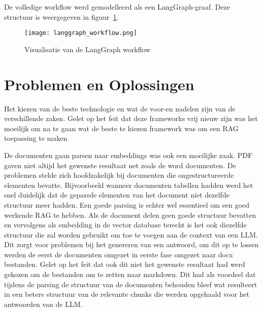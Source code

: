 De volledige workflow werd gemodelleerd als een LangGraph-graaf. Deze structuur is weergegeven in figuur~\ref{fig:langgraph}.

\begin{figure}[H]
    \centering
    \texttt{[image: langgraph\_workflow.png]}
    \caption{Visualisatie van de LangGraph workflow}
    \label{fig:langgraph}
\end{figure}




\section{Problemen en Oplossingen}


Het kiezen van de beste technologie en wat de voor-en nadelen zijn van de verschillende zaken. Gelet op het feit dat deze frameworks vrij nieuw zijn was het moeilijk om na te gaan wat de beste te kiezen framework was om een RAG toepassing te maken

De documenten gaan parsen naar embeddings was ook een moeilijke zaak. PDF gaven niet altijd het gewenste resultaat net zoals de word documenten.
De problemen stelde zich hoofdzakelijk bij documenten die ongestructureerde elementen bevatte. Bijvoorbeeld wanneer documenten tabellen hadden werd het snel duidelijk dat de geparsde elementen van het document niet dezelfde structuur meer hadden. Een goede parsing is echter wel essentieel om een goed werkende RAG te hebben. Als de document delen geen goede structuur bevatten en vervolgens als embedding in de vector database terecht is het ook diezelfde structuur die zal worden gebruikt om toe te voegen aan de context van een LLM. Dit zorgt voor problemen bij het genereren van een antwoord, om dit op te lossen werden de eerst de documenten omgezet in eerste fase omgezet naar docx bestanden. Gelet op het feit dat ook dit niet het gewenste resultaat had werd gekozen om de bestanden om te zetten naar markdown. Dit had als voordeel dat tijdens de parsing de structuur van de documenten behouden bleef wat resulteert in een betere structuur van de relevante chunks die werden opgehaald voor het antwoorden van de LLM.

